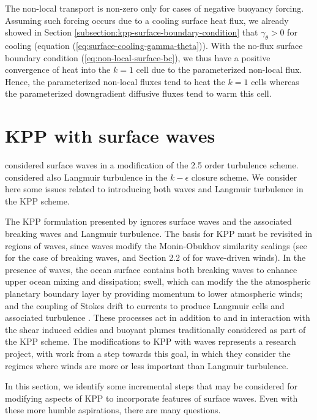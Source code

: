 The non-local transport is non-zero only for cases of negative
buoyancy forcing.  Assuming such forcing occurs due to a cooling
surface heat flux, we already showed in Section
\ref{subsection:kpp-surface-boundary-condition} that $\gamma_{\theta}
> 0$ for cooling (equation (\ref{eq:surface-cooling-gamma-theta})).
With the no-flux surface boundary condition
(\ref{eq:non-local-surface-bc}), we thus have a positive convergence
of heat into the $k=1$ cell due to the parameterized non-local flux.
Hence, the parameterized non-local fluxes tend to heat the $k=1$ cells
whereas the parameterized downgradient diffusive fluxes tend to warm
this cell.


\section{KPP with surface waves}
\label{section:surface-waves-and-kpp}

\cite{Craig_Banner_1994} considered surface waves in a modification of
the \cite{MellorYamada1982} 2.5 order turbulence scheme.
\cite{Axell_2002} considered also Langmuir turbulence in the
$k-\epsilon$ closure scheme.  We consider here some issues related to
introducing both waves and Langmuir turbulence in the KPP scheme.

The KPP formulation presented by \cite{LargeKPP} ignores surface waves
and the associated breaking waves and Langmuir turbulence.  The basis
for KPP must be revisited in regions of waves, since waves modify the
Monin-Obukhov similarity scalings (see \cite{Terray_etal1996} for the
case of breaking waves, and Section 2.2 of
\cite{SullivanMcWilliams2010} for wave-driven winds).  In the presence
of waves, the ocean surface contains both breaking waves to enhance
upper ocean mixing and dissipation; swell, which can modify the the
atmospheric planetary boundary layer by providing momentum to lower
atmospheric winds; and the coupling of Stokes drift to currents to
produce Langmuir cells and associated turbulence
\citep{McWilliams_etal1997}.  These processes act in addition to and
in interaction with the shear induced eddies and buoyant plumes
traditionally considered as part of the KPP scheme.  The modifications
to KPP with waves represents a research project, with work from
\cite{Belcher_etal2012} a step towards this goal, in which they
consider the regimes where winds are more or less important than
Langmuir turbulence.

In this section, we identify some incremental steps that may be
considered for modifying aspects of KPP to incorporate features of
surface waves.  Even with these more humble aspirations, there are
many questions.


